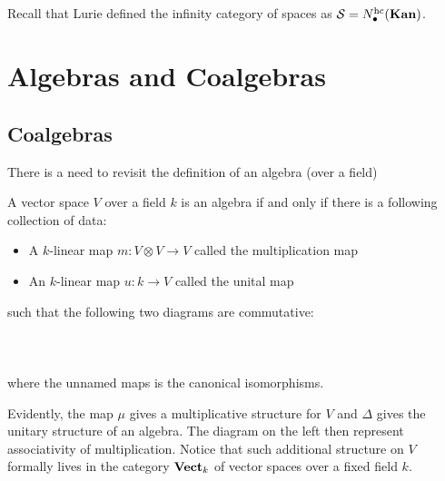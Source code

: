 \documentclass[a4paper]{article}
\begin{document}
\subsection{}
Recall that Lurie defined the infinity category of spaces as $\mathcal{S}=N_\bullet^\text{hc}(\bold{Kan})$. 

\subsection{}

\pagebreak
\section{Algebras and Coalgebras}
\subsection{Coalgebras}
There is a need to revisit the definition of an algebra (over a field)

\begin{prp}{}{} A vector space $V$ over a field $k$ is an algebra if and only if there is a following collection of data: 
\begin{itemize}
\item A $k$-linear map $m:V\otimes V\to V$ called the multiplication map
\item An $k$-linear map $u:k\to V$ called the unital map
\end{itemize}
such that the following two diagrams are commutative: \\~\\
\\~\\
where the unnamed maps is the canonical isomorphisms. 
\end{prp}

Evidently, the map $\mu$ gives a multiplicative structure for $V$ and $\Delta$ gives the unitary structure of an algebra. The diagram on the left then represent associativity of multiplication. Notice that such additional structure on $V$ formally lives in the category $\bold{Vect}_k$ of vector spaces over a fixed field $k$. \\~\\
\end{document}
